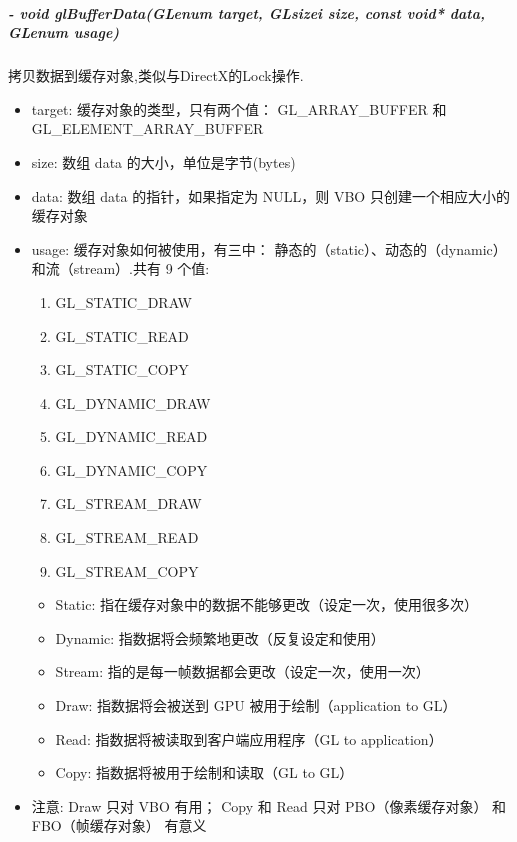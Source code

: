 \documentclass[UTF8,a4paper,8pt]{ctexbook}
\begin{document}
			\subparagraph{- void glBufferData(GLenum target, GLsizei size, const void* data, GLenum usage)}拷贝数据到缓存对象,类似与DirectX的Lock操作.
				\begin{itemize}
					\item target: 缓存对象的类型，只有两个值： GL\_ARRAY\_BUFFER 和 GL\_ELEMENT\_ARRAY\_BUFFER
					
					\item size: 数组 data 的大小，单位是字节(bytes)
					\item data: 数组 data 的指针，如果指定为 NULL，则 VBO 只创建一个相应大小的缓存对象
					\item usage: 缓存对象如何被使用，有三中： 静态的（static）、动态的（dynamic）和流（stream）.共有 9 个值:
						\begin{enumerate}
							\item GL\_STATIC\_DRAW
							\item GL\_STATIC\_READ
							\item GL\_STATIC\_COPY
							\item GL\_DYNAMIC\_DRAW
							\item GL\_DYNAMIC\_READ
							\item GL\_DYNAMIC\_COPY
							\item GL\_STREAM\_DRAW
							\item GL\_STREAM\_READ
							\item GL\_STREAM\_COPY
						\end{enumerate}
						
						\begin{itemize}
							\item Static: 指在缓存对象中的数据不能够更改（设定一次，使用很多次）
							\item Dynamic: 指数据将会频繁地更改（反复设定和使用）
							\item Stream: 指的是每一帧数据都会更改（设定一次，使用一次）
						\end{itemize}
						
						\begin{itemize}
							\item Draw: 指数据将会被送到 GPU 被用于绘制（application to GL）
							\item Read: 指数据将被读取到客户端应用程序（GL to application）
							\item Copy: 指数据将被用于绘制和读取（GL to GL）
						\end{itemize}
					\item 注意: Draw 只对 VBO 有用； Copy 和 Read 只对 PBO（像素缓存对象） 和 FBO（帧缓存对象） 有意义
				\end{itemize}
			
\end{document}
